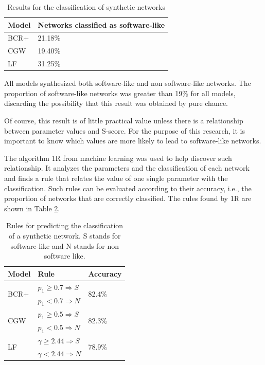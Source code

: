 \begin{table}
\caption{Results for the classification of synthetic networks}
\centering
\begin{tabular}{|l|l|}
\hline
Model & Networks classified as software-like \\
\hline 
\hline
BCR+ & 21.18\% \\ %
\hline
CGW  & 19.40\% \\  %
\hline
LF   & 31.25\% \\ %
\hline
\end{tabular}
\label{tab:results}
\end{table}

All models synthesized both software-like and non software-like networks. The
proportion of software-like networks was greater than 19\% for all models,
discarding the possibility that this result was obtained by pure chance.

%
%
%
%

Of course, this result is of little practical value unless there is a
relationship between parameter values and S-score. For the purpose of this
research, it is important to know which values are more likely to lead to
software-like networks.

The algorithm 1R \cite{OneR} from machine learning was used to help discover
such relationship. It analyzes the parameters and the classification of each
network and finds a rule that relates the value of one single parameter with the
classification. Such rules can be evaluated according to their accuracy, i.e.,
the proportion of networks that are correctly classified. The rules found by 1R
are shown in Table \ref{tab:rules}.

\begin{table}
\caption{Rules for predicting the classification of a synthetic network. S
stands for software-like and N stands for non software like.}
\centering
\begin{tabular}{|l|l|l|}
\hline
Model & Rule & Accuracy \\
\hline 
\hline
\multirow{2}{*}{BCR+}
     & $p_1 \ge 0.7 \Rightarrow S$ & \multirow{2}{*}{82.4\%}  \\ 
     & $p_1 < 0.7 \Rightarrow N$ & \\ 
\hline
\multirow{2}{*}{CGW}
     & $p_1 \ge 0.5 \Rightarrow S$ & \multirow{2}{*}{82.3\%} \\  
     & $p_1 < 0.5 \Rightarrow N$ & \\  
\hline
\multirow{2}{*}{LF}   
     & $\gamma \ge 2.44 \Rightarrow S$ & \multirow{2}{*}{78.9\%} \\ 
     & $\gamma < 2.44 \Rightarrow N$ & \\ 
\hline
\end{tabular}
\label{tab:rules}
\end{table}

